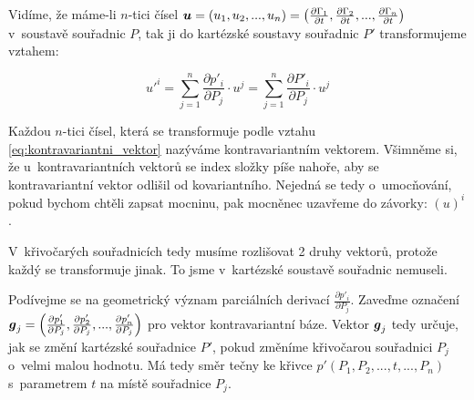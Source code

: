 Vidíme, že máme-li \(n\)-tici čísel \(\boldsymbol{u} = (u_1, u_2, ..., u_n) = \left( \frac{\partial \Gamma_1}{\partial t}, \frac{\partial \Gamma_2}{\partial t}, ..., \frac{\partial \Gamma_n}{\partial t} \right)\) v~soustavě souřadnic \(P\), tak ji do kartézské soustavy souřadnic \(P'\) transformujeme vztahem:

\begin{equation}
\label{eq:kontravariantni_vektor}
u'^i = \sum_{j=1}^n \frac{\partial p'_i}{\partial P_j} \cdot u^j = \sum_{j=1}^n \frac{\partial P'_i}{\partial P_j} \cdot u^j
\end{equation}

Každou \(n\)-tici čísel, která se transformuje podle vztahu \eqref{eq:kontravariantni_vektor} nazýváme kontravariantním vektorem. Všimněme si, že u~kontravariantních vektorů se index složky píše nahoře, aby se kontravariantní vektor odlišil od kovariantního. Nejedná se tedy o~umocňování, pokud bychom chtěli zapsat mocninu, pak mocněnec uzavřeme do závorky: \((u)^i\).

V~křivočarých souřadnicích tedy musíme rozlišovat 2 druhy vektorů, protože každý se transformuje jinak. To jsme v~kartézské soustavě souřadnic nemuseli.

Podívejme se na geometrický význam parciálních derivací \(\frac{\partial p'_i}{\partial P_j}\). Zaveďme označení \(\boldsymbol{g}_j = \left(\frac{\partial p'_1}{\partial P_j}, \frac{\partial p'_2}{\partial P_j}, ..., \frac{\partial p'_n}{\partial P_j}\right)\) pro vektor kontravariantní báze. Vektor \(\boldsymbol{g}_j\) tedy určuje, jak se změní kartézské souřadnice \(P'\), pokud změníme křivočarou souřadnici \(P_j\) o~velmi malou hodnotu. Má tedy směr tečny ke křivce \(p'(P_1, P_2, ..., t, ..., P_n)\) s~parametrem \(t\) na místě souřadnice \(P_j\).

 

